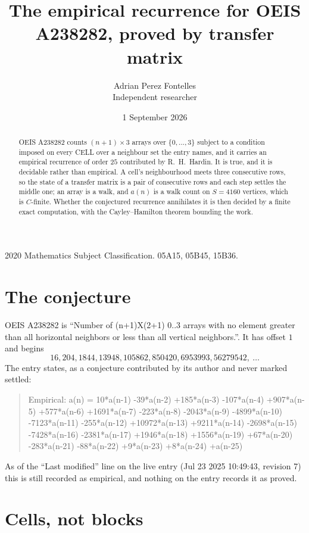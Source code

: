 \documentclass[11pt,a4paper]{article}
\title{The empirical recurrence for OEIS A238282, proved by transfer matrix}
\author{Adrian Perez Fontelles\\ \small Independent researcher}
\date{1 September 2026}
\theoremstyle{plain}
\theoremstyle{definition}
\begin{document}
\maketitle

\begin{abstract}
OEIS A238282 counts $(n+1)\times3$ arrays over $\{0,\dots,3\}$ subject to a condition imposed on
every CELL over a neighbour set the entry names, and it carries an empirical recurrence of
order $25$ contributed by R.~H.~Hardin. It is true, and it is decidable rather than
empirical. A cell's neighbourhood meets three consecutive rows, so the state of a transfer
matrix is a pair of consecutive rows and each step settles the middle one; an array is a
walk, and $a(n)$ is a walk count on $S=4160$ vertices, which is $C$-finite. Whether the
conjectured recurrence annihilates it is then decided by a finite exact computation, with the
Cayley--Hamilton theorem bounding the work.
\end{abstract}

\noindent\small 2020 Mathematics Subject Classification. 05A15, 05B45, 15B36.\normalsize

\section{The conjecture}

OEIS A238282 is ``Number of (n+1)X(2+1) 0..3 arrays with no element greater than all horizontal neighbors or less than all vertical neighbors.''. It has offset $1$ and begins
\[
16, 204, 1844, 13948, 105862, 850420, 6953993, 56279542,\ \dots
\]
The entry states, as a conjecture contributed by its author and never marked settled:
\begin{quote}
Empirical: a(n) = 10*a(n-1) -39*a(n-2) +185*a(n-3) -107*a(n-4) +907*a(n-5) +577*a(n-6) +1691*a(n-7) -223*a(n-8) -2043*a(n-9) -4899*a(n-10) -7123*a(n-11) -255*a(n-12) +10972*a(n-13) +9211*a(n-14) -2698*a(n-15) -7428*a(n-16) -2381*a(n-17) +1946*a(n-18) +1556*a(n-19) +67*a(n-20) -283*a(n-21) -88*a(n-22) +9*a(n-23) +8*a(n-24) +a(n-25)
\end{quote}
As of the ``Last modified'' line on the live entry (Jul 23 2025 10:49:43, revision 7) this is still
recorded as empirical, and nothing on the entry records it as proved.

\section{Cells, not blocks}
\end{document}
